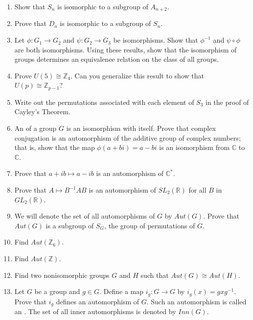 {\begin{enumerate}[(1)]
\item
Show that $S_n$ is isomorphic to a subgroup of $A_{n+2}$.  

\item
Prove that $D_n$ is isomorphic to a subgroup of $S_n$.
 

\item
Let $\phi : G_1 \rightarrow G_2$ and  $\psi : G_2 \rightarrow G_3$  be
isomorphisms. Show that  $\phi^{-1}$ and $\psi \circ \phi$ are both
isomorphisms. Using these results, show that the isomorphism of groups
determines an equivalence relation on the class of all groups.
 

\item
Prove $U(5) \cong {\mathbb Z}_4$. Can you generalize this result to show
that $U(p) \cong {\mathbb Z}_{p-1}$? 
 

\item
Write out the permutations associated with each element of $S_3$ in
the proof of Cayley's Theorem. 
 
 

\item
An  of a group $G$ is an isomorphism
with itself. Prove that complex conjugation is an automorphism of the
additive group of complex numbers; that is, show that the map $\phi(
a + bi ) = a - bi$ is an isomorphism from ${\mathbb C}$ to ${\mathbb C}$. 
 

\item
Prove that $a + ib \mapsto a - ib$ is an automorphism of ${\mathbb C}^*$. 
 

\item
Prove that $A \mapsto B^{-1}AB$ is an automorphism of $SL_2({\mathbb R})$
for all $B$ in $GL_2({\mathbb R})$. 
 
\item
We will denote the set of all automorphisms of $G$ by
$Aut(G)$\label{noteauto}.  Prove that  $Aut(G)$ is a subgroup of
$S_G$, the group of permutations of $G$. 
 
\item
Find $Aut( {\mathbb Z}_6)$.

\item
Find $Aut( {\mathbb Z})$.
 
\item
Find two nonisomorphic groups $G$ and $H$ such that $Aut(G) \cong Aut(
H)$. 
 
\item
Let $G$ be a group and $g \in G$. Define a map $i_g : G \rightarrow
G$\label{noteinner} 
by $i_g(x) = g x g^{-1}$.  Prove that $i_g$ defines an automorphism of
$G$.  Such an automorphism is called an . The set of all inner
automorphisms is denoted by $Inn(G)$\label{noteinneraut}. 
 

\end{enumerate}}

